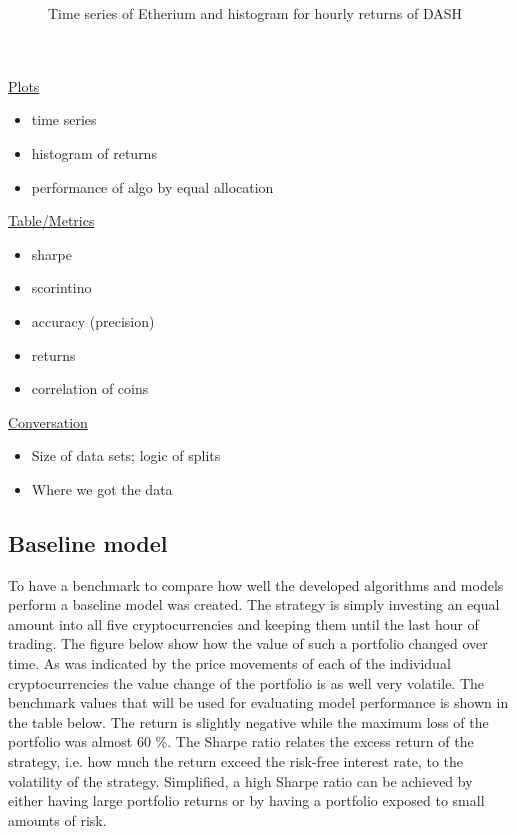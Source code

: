 \documentclass{article}
\begin{document}
\begin{figure}[H]
\centering
    \qquad
    \caption{Time series of Etherium and histogram for hourly returns of DASH}
\end{figure}
\\
\\
\underline{Plots}
\begin{itemize}
\item time series
\item histogram of returns
\item performance of algo by equal allocation
\end{itemize}

\underline{Table/Metrics}
\begin{itemize}
\item sharpe
\item scorintino
\item accuracy (precision)
\item returns
\item correlation of coins
\end{itemize}

\underline{Conversation}
\begin{itemize}
\item Size of data sets; logic of splits
\item Where we got the data
\end{itemize}


\subsection{Baseline model}
To have a benchmark to compare how well the developed algorithms and models perform a baseline model was created. The strategy is simply investing an equal amount into all five cryptocurrencies and keeping them until the last hour of trading. The figure below show how the value of such a portfolio changed over time. As was indicated by the price movements of each of the individual cryptocurrencies the value change of the portfolio is as well very volatile. The benchmark values that will be used for evaluating model performance is shown in the table below. The return is slightly negative while the maximum loss of the portfolio was almost 60 \%. The Sharpe ratio relates the excess return of the strategy, i.e. how much the return exceed the risk-free interest rate, to the volatility of the strategy. Simplified, a high Sharpe ratio can be achieved by either having large portfolio returns or by having a portfolio exposed to small amounts of risk.
\end{document}

